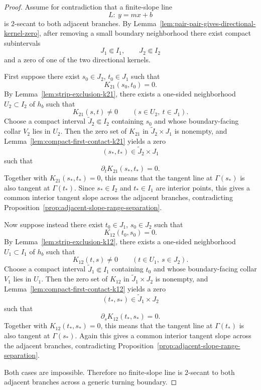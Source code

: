 \documentclass[11pt,a4paper]{amsart}
\theoremstyle{plain}
\theoremstyle{definition}
\begin{document}
\begin{proof}
Assume for contradiction that a finite-slope line
\[
L:\ y=mx+b
\]
is $2$-secant to both adjacent branches. By
Lemma~\ref{lem:pair-pair-gives-directional-kernel-zero}, after removing a
small boundary neighborhood there exist compact subintervals
\[
J_1\Subset I_1,\qquad J_2\Subset I_2
\]
and a zero of one of the two directional kernels.

First suppose there exist $s_0\in J_2$, $t_0\in J_1$ such that
\[
K_{21}(s_0,t_0)=0.
\]
By Lemma~\ref{lem:strip-exclusion-k21}, there exists a one-sided neighborhood
$U_2\subset I_2$ of $h_b$ such that
\[
K_{21}(s,t)\neq 0
\qquad
(s\in U_2,\ t\in J_1).
\]
Choose a compact interval $\widetilde J_2\Subset I_2$ containing $s_0$ and
whose boundary-facing collar $V_2$ lies in $U_2$. Then the zero set of
$K_{21}$ in $\widetilde J_2\times J_1$ is nonempty, and
Lemma~\ref{lem:compact-first-contact-k21} yields a zero
\[
(s_*,t_*)\in \widetilde J_2\times J_1
\]
such that
\[
\partial_t K_{21}(s_*,t_*)=0.
\]
Together with $K_{21}(s_*,t_*)=0$, this means that the tangent line at
$\Gamma(s_*)$ is also tangent at $\Gamma(t_*)$. Since
$s_*\in I_2$ and $t_*\in I_1$ are interior points, this gives a common
interior tangent slope across the adjacent branches, contradicting
Proposition~\ref{prop:adjacent-slope-range-separation}.

Now suppose instead there exist $t_0\in J_1$, $s_0\in J_2$ such that
\[
K_{12}(t_0,s_0)=0.
\]
By Lemma~\ref{lem:strip-exclusion-k12}, there exists a one-sided neighborhood
$U_1\subset I_1$ of $h_b$ such that
\[
K_{12}(t,s)\neq 0
\qquad
(t\in U_1,\ s\in J_2).
\]
Choose a compact interval $\widetilde J_1\Subset I_1$ containing $t_0$ and
whose boundary-facing collar $V_1$ lies in $U_1$. Then the zero set of
$K_{12}$ in $\widetilde J_1\times J_2$ is nonempty, and
Lemma~\ref{lem:compact-first-contact-k12} yields a zero
\[
(t_*,s_*)\in \widetilde J_1\times J_2
\]
such that
\[
\partial_s K_{12}(t_*,s_*)=0.
\]
Together with $K_{12}(t_*,s_*)=0$, this means that the tangent line at
$\Gamma(t_*)$ is also tangent at $\Gamma(s_*)$. Again this gives a common
interior tangent slope across the adjacent branches, contradicting
Proposition~\ref{prop:adjacent-slope-range-separation}.

Both cases are impossible. Therefore no finite-slope line is $2$-secant to
both adjacent branches across a generic turning boundary.
\end{proof}
\end{document}
